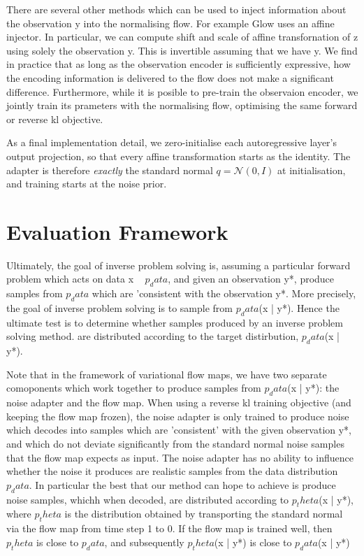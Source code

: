 \documentclass[12pt,a4paper]{report}
\begin{document}
There are several other methods which can be used to inject information about the observation y into the normalising flow. 
For example Glow uses an affine injector. In particular, we can compute shift and scale of affine transfornation of z using solely the observation y. 
This is invertible assuming that we have y. 
We find in practice that as long as the observation encoder is sufficiently expressive, how the encoding information is delivered to the flow does not make a significant difference. 
Furthermore, while it is posible to pre-train the observaion encoder, we jointly train its prameters with the normalising flow, optimising the same forward or reverse kl objective. 

As a final implementation detail, we zero-initialise each autoregressive layer's output
projection, so that every affine transformation starts as the identity.
The adapter is therefore \emph{exactly} the standard normal $q = \mathcal{N}(0, I)$ at initialisation, and training starts at the noise prior.

\section{Evaluation Framework}
Ultimately, the goal of inverse problem solving is, assuming a particular forward problem which acts on data x ~ $p_data$, and given an observation y*, produce samples from $p_data$ which are 'consistent with the observation y*. 
More precisely, the goal of inverse problem solving is to sample from $p_data$(x | y*). 
Hence the ultimate test is to determine whether samples produced by an inverse problem solving method. are distributed according to the target distirbution, $p_data$(x | y*). 

Note that in the framework of variational flow maps, we have two separate comoponents which work together to produce samples from $p_data$(x | y*): the noise adapter and the flow map. 
When using a reverse kl training objective (and keeping the flow map frozen), the noise adapter is only trained to produce noise which decodes into samples which are 'consistent' with the given observation y*, and which do not deviate significantly from the standard normal noise samples that the flow map expects as input. 
The noise adapter has no ability to influence whether the noise it produces are realistic samples from the data distribution $p_data$. 
In particular the best that our method can hope to achieve is produce noise samples, whichh when decoded, are distributed according to $p_theta$(x | y*), where $p_theta$ is the distribution obtained by transporting the standard normal via the flow map from time step 1 to 0. 
If the flow map is trained well, then $p_theta$ is close to $p_data$, and subsequently $p_theta$(x | y*) is close to $p_data$(x | y*)
\end{document}
